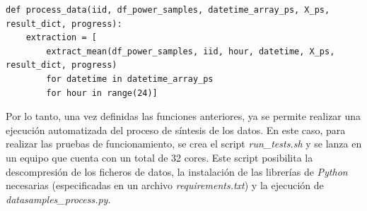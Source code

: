 \vspace{3mm}

\begin{lstlisting}[style=Python, caption={Función de automatización del cálculo del promedio}]
  def process_data(iid, df_power_samples, datetime_array_ps, X_ps, result_dict, progress):
    extraction = [
        extract_mean(df_power_samples, iid, hour, datetime, X_ps, result_dict, progress)
        for datetime in datetime_array_ps
        for hour in range(24)]
\end{lstlisting}

\vspace{3mm}

Por lo tanto, una vez definidas las funciones anteriores, ya se permite realizar una ejecución automatizada del proceso de síntesis de los datos. En este caso, para realizar las pruebas de funcionamiento, se crea el script \textit{run\_tests.sh} y se lanza en un equipo que cuenta con un total de 32 cores. Este script posibilita la descompresión de los ficheros de datos, la instalación de las librerías de \textit{Python} necesarias (especificadas en un archivo \textit{requirements.txt}) y la ejecución de \textit{datasamples\_process.py}.

\vspace{3mm}


  
  
  
  
  
  
